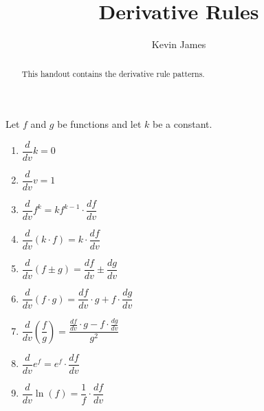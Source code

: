 \documentclass[handout,nooutcomes,noauthor,12pt]{ximera}
\author{Kevin James}
\title{Derivative Rules}
\begin{document}
	\begin{abstract}
		This handout contains the derivative rule patterns.
	\end{abstract}
	\maketitle
	Let $ f $ and $g$ be functions and let $k$ be a constant.
	\begin{enumerate}[label=\arabic*.]
		\item $\dfrac{d}{dv}k = 0$
		\vspace{5mm}
		\item $ \dfrac{d}{dv} v = 1 $
		\vspace{5mm}
		\item $ \dfrac{d}{dv} f^k = kf^{k-1} \cdot \dfrac{df}{dv} $
		\vspace{5mm}
		\item $ \dfrac{d}{dv} \left(k \cdot f\right) = k \cdot \dfrac{df}{dv} $
		\item $\dfrac{d}{dv}\left(f \pm g \right) = \dfrac{df}{dv} \pm \dfrac{dg}{dv}$
		\vspace{5mm}
		\item $\dfrac{d}{dv}\left(f \cdot g \right) = \dfrac{df}{dv} \cdot g + f \cdot \dfrac{dg}{dv} $
		\vspace{5mm}
		\item $ \dfrac{d}{dv} \left( \dfrac{f}{g} \right) = \dfrac{\frac{df}{dv} \cdot g - f \cdot \frac{dg}{dv}}{g^2} $
		\vspace{5mm}
		\item $ \dfrac{d}{dv} e^{f} = e^{f} \cdot \dfrac{df}{dv}  $
		\vspace{5mm}
		\item $ \dfrac{d}{dv} \ln(f) = \dfrac{1}{f} \cdot \dfrac{df}{dv}  $
		\vspace{5mm}
		
		\clearpage
		

\end{enumerate}
\end{document}
